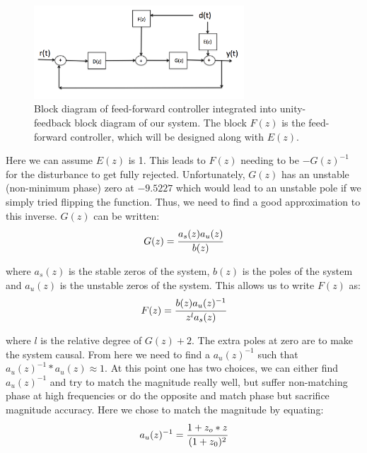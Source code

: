 \documentclass[11pt]{article}
\begin{document}
\begin{figure}[H]
    \centering
    \includegraphics[width=0.7\textwidth]{Diagram2.png}
    \caption{Block diagram of feed-forward controller integrated into unity-feedback block diagram of our system. The block $F(z)$ is the feed-forward controller, which will be designed along with $E(z)$.}
    \label{fig:d2}
\end{figure} 
Here we can assume $E(z)$ is 1. This leads to $F(z)$ needing to be $-G(z)^{-1}$ for the disturbance to get fully rejected. Unfortunately, $G(z)$ has an unstable (non-minimum phase) zero at $-9.5227$ which would lead to an unstable pole if we simply tried flipping the function. Thus, we need to find a good approximation to this inverse. $G(z)$ can be written:
\[G(z)=\cfrac{a_s(z)a_u(z)}{b(z)}\]

where $a_s(z)$ is the stable zeros of the system, $b(z)$ is the poles of the system and $a_u(z)$ is the unstable zeros of the system. This allows us to write $F(z)$ as:
\[F(z)=\cfrac{b(z)a_u(z)^{-1}}{z^la_s(z)}\]

where $l$ is the relative degree of $G(z) + 2$.
The extra poles at zero are to make the system causal. From here we need to find a $a_u(z)^{-1}$ such that $a_u(z)^{-1}*a_u(z)\approx 1$. At this point one has two choices, we can either find $a_u(z)^{-1}$ and try to match the magnitude really well, but suffer non-matching phase at high frequencies or do the opposite and match phase but sacrifice magnitude accuracy. Here we chose to match the magnitude by equating:
\[a_u(z)^{-1}=\cfrac{1+z_o*z}{(1+z_0)^2}\]
\end{document}
